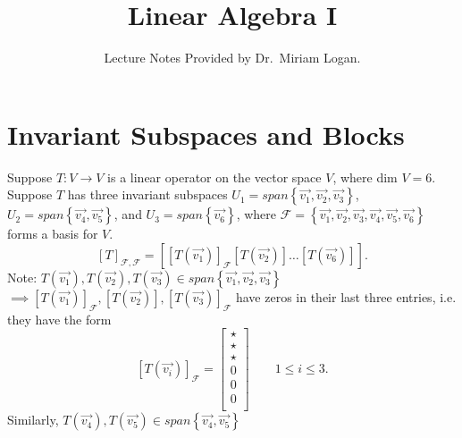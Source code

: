 \documentclass{report}
\begin{document}
\title{Linear Algebra I}
\author{Lecture Notes Provided by Dr.~Miriam Logan.}
\date{}
\maketitle
\tableofcontents
\newpage  

\section{Invariant Subspaces and Blocks}
 	
Suppose $ T: V \to V$ is a linear operator on the vector space $ V$, where dim $ V = 6$. Suppose $ T$ has three invariant subspaces $ U_1 = span \left\{ \vec{ v_1} , \vec{ v_2} , \vec{ v_3} \right\}$, $ U_2 = span \left\{ \vec{ v_4} , \vec{ v_5} \right\}$, and $ U_3 = span \left\{ \vec{ v_6} \right\}$, where $ \mathcal{F} = \left\{ \vec{ v_1} ,\vec{ v_2} ,\vec{ v_3} ,\vec{ v_4} ,\vec{ v_5} ,\vec{ v_6}  \right\} $ forms a basis for $ V$.
\[
	\left[ T \right]  _{ \mathcal{F} , \mathcal{F}}= \left[ \left[ T \left( \vec{ v_1}  \right)  \right]_{ \mathcal{F}} \left[ T \left( \vec{ v_2}  \right)  \right]  \ldots \left[ T \left( \vec{ v_6}  \right)  \right]\right] 
.\] 
Note: $ T \left( \vec{ v_1}  \right) , T \left( \vec{ v_2}  \right) , T \left( \vec{ v_3}  \right)  \in span \left\{ \vec{ v_1} ,\vec{ v_2 } , \vec{ v_3}  \right\} $ \\
$ \implies \left[ T \left( \vec{ v_1}  \right)  \right] _{ \mathcal{F}}, \left[ T \left( \vec{ v_2}  \right)  \right] , \left[ T \left( \vec{ v_3}  \right)  \right] _{\mathcal{F}}$        have zeros in their last three entries, i.e.  they have the form
\[
	\left[ T \left( \vec{ v_i}  \right)  \right] _{ \mathcal{F}} = \begin{bmatrix}
		\star\\
		 \star\\
		 \star\\
	0\\
	0\\
	0\\
	\end{bmatrix}
	   \qquad  1 \leq i \leq 3
.\] 
Similarly, $ T \left( \vec{ v_4}  \right) , T \left( \vec{ v_5}  \right)  \in span \left\{ \vec{ v_4} ,\vec{ v_5 }  \right\} $ \\
\end{document}
